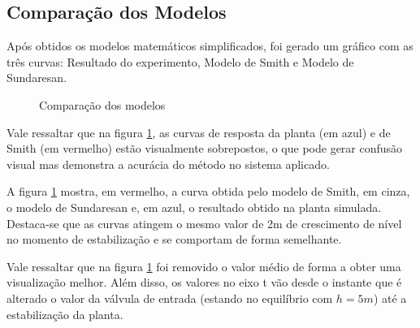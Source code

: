 \documentclass[
	article,			%
	11pt,				%
	oneside,			%
	a4paper,			%
	section=TITLE,		%
	english,			%
	brazil,				%
	sumario=tradicional
	]{abntex2}
\begin{document}
\subsection{Comparação dos Modelos}
Após obtidos os modelos matemáticos simplificados, foi gerado um gráfico com as três curvas: Resultado do experimento, Modelo de Smith e Modelo de Sundaresan. 
\begin{figure}[H]
    \centering
    \caption{Comparação dos modelos}
    \label{fig:comp-modelos-sund}
\end{figure}

Vale ressaltar que na figura \ref{fig:comp-modelos-sund}, as curvas de resposta da planta (em azul) e de Smith (em vermelho) estão visualmente sobrepostos, o que pode gerar confusão visual mas demonstra a acurácia do método no sistema aplicado.

A figura \ref{fig:comp-modelos-sund} mostra, em vermelho, a curva obtida pelo modelo de Smith, em cinza, o modelo de Sundaresan e, em azul, o resultado obtido na planta simulada. Destaca-se que as curvas atingem o mesmo valor de 2m de crescimento de nível no momento de estabilização e se comportam de forma semelhante.

Vale ressaltar que na figura \ref{fig:comp-modelos-sund} foi removido o valor médio de forma a obter uma visualização melhor. Além disso, os valores no eixo t vão desde o instante que é alterado o valor da válvula de entrada (estando no equilíbrio com $h=5m$) até a estabilização da planta.
\end{document}

